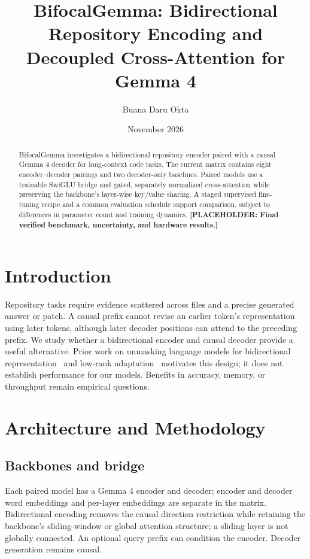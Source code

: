 \documentclass[10pt,twocolumn]{article}
\title{BifocalGemma: Bidirectional Repository Encoding and Decoupled Cross-Attention for Gemma 4}
\author{Buana Daru Okta}
\date{November 2026}
\begin{document}
\maketitle
\begin{abstract}
BifocalGemma investigates a bidirectional repository encoder paired with a causal Gemma 4 decoder for long-context code tasks. The current matrix contains eight encoder--decoder pairings and two decoder-only baselines. Paired models use a trainable SwiGLU bridge and gated, separately normalized cross-attention while preserving the backbone's layer-wise key/value sharing. A staged supervised fine-tuning recipe and a common evaluation schedule support comparison, subject to differences in parameter count and training dynamics. \textbf{[PLACEHOLDER: Final verified benchmark, uncertainty, and hardware results.]}
\end{abstract}
\section{Introduction}
Repository tasks require evidence scattered across files and a precise generated answer or patch. A causal prefix cannot revise an earlier token's representation using later tokens, although later decoder positions can attend to the preceding prefix. We study whether a bidirectional encoder and causal decoder provide a useful alternative. Prior work on unmasking language models for bidirectional representation~\cite{llm2vec_2024} and low-rank adaptation~\cite{lora_2022} motivates this design; it does not establish performance for our models. Benefits in accuracy, memory, or throughput remain empirical questions.
\section{Architecture and Methodology}
\subsection{Backbones and bridge}
Each paired model has a Gemma 4 encoder and decoder; encoder and decoder word embeddings and per-layer embeddings are separate in the matrix. Bidirectional encoding removes the causal direction restriction while retaining the backbone's sliding-window or global attention structure; a sliding layer is not globally connected. An optional query prefix can condition the encoder. Decoder generation remains causal.
\end{document}
